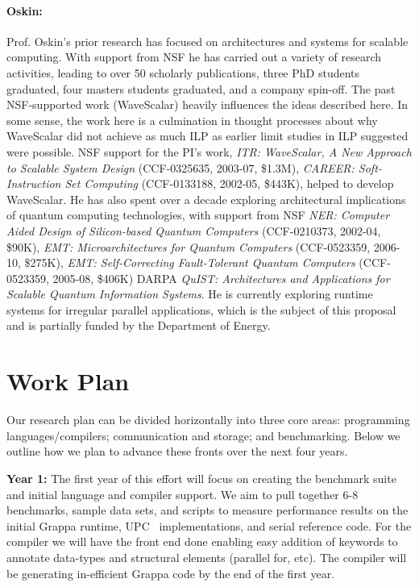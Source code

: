 \paragraph{Oskin:} Prof. Oskin's prior research has focused on architectures and systems for scalable computing.  With support from NSF he has carried out a variety of research activities, leading to over 50 scholarly publications, three PhD students graduated, four masters students graduated, and a company spin-off.  The past NSF-supported work (WaveScalar) heavily influences the ideas described here. In some sense, the work here is a culmination in thought processes about why WaveScalar did not achieve as much ILP as earlier limit studies in ILP suggested were possible.  NSF support for the PI's work, {\em ITR: WaveScalar, A New Approach to Scalable System Design} (CCF-0325635, 2003-07, \$1.3M), {\em CAREER: Soft-Instruction Set Computing} (CCF-0133188, 2002-05, \$443K), helped to develop WaveScalar.  He has also spent over a decade exploring architectural implications of quantum computing technologies, with support from NSF {\em NER: Computer Aided Design of Silicon-based Quantum Computers} (CCF-0210373, 2002-04, \$90K), {\em EMT: Microarchitectures for Quantum Computers} (CCF-0523359, 2006-10, \$275K), {\em EMT: Self-Correcting Fault-Tolerant Quantum Computers} (CCF-0523359, 2005-08, \$406K) DARPA {\em QuIST: Architectures and Applications for Scalable Quantum Information Systems}.  He is currently exploring runtime systems for irregular parallel applications, which is the subject of this proposal and is partially funded by the Department of Energy.

\section{Work Plan}
\label{sec:plan}

Our research plan can be divided horizontally into three core areas: programming languages/compilers; communication and storage; and benchmarking. Below we outline how we plan to advance these fronts over the next four years.

\vspace{2ex}


\noindent\textbf{Year 1:} The first year of this effort will focus on creating the benchmark suite and initial language and compiler support.  We aim to pull together 6-8 benchmarks, sample data sets, and scripts to measure performance results on the initial Grappa runtime, UPC~\cite{upc:2005} implementations, and serial reference code.  For the compiler we will have the front end done enabling easy addition of keywords to annotate data-types and structural elements (parallel for, etc).  The compiler will be generating in-efficient Grappa code by the end of the first year.

